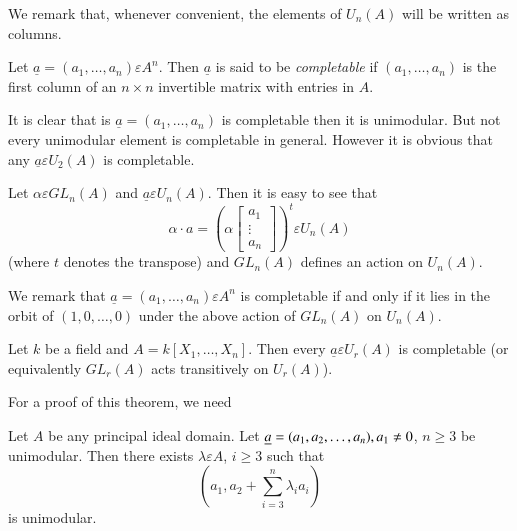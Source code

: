 We remark that, whenever convenient, the elements of $U_n(A)$ will be
written as columns.

\begin{dfn}\label{c2:dfn2.1}
Let $\underline{a}=(a_1,\ldots,a_n)\varepsilon A^{n}$. Then
$\underline{a}$ is said to be \textit{completable} if
$(a_1,\ldots,a_n)$ is the first column of an $n\times n$ invertible
matrix with entries in $A$.

It is clear that is $\underline{a}=(a_1,\ldots,a_n)$ is completable
then it is unimodular. But not every unimodular element is completable
in general. However it is obvious that any $\underline{a}\varepsilon
U_2(A)$ is completable.

Let $\alpha \varepsilon GL_n(A)$ and $\underline{a}\varepsilon
U_n(A)$. Then it is easy to see that 
$$
\alpha\cdot a=\left(\alpha\begin{bmatrix}
a_1\\
\vdots\\
a_n
\end{bmatrix}\right)^{t} \varepsilon U_n(A)
$$
(where $t$ denotes the transpose) and $GL_n(A)$ defines an action on
$U_n(A)$.

We remark that $\underline{a}=(a_1,\ldots,a_n)\varepsilon A^{n}$ is
completable if and only if it lies in the orbit of $(1,0,\ldots,0)$
under the above action of $GL_n(A)$ on $U_n(A)$.
\end{dfn}


\begin{thm}\label{c2:thm2.2}
Let $k$ be a field and $A=k[X_1,\ldots,X_n]$. Then every
$\underline{a}\varepsilon U_r(A)$ is completable (or equivalently
$GL_r(A)$ acts transitively on $U_r(A)$).
\end{thm}

For a proof of this theorem, we need

\begin{lem}\label{c2:lem2.3}
Let  $A$ be any principal ideal domain. Let
$\underline{a}=\\(a_1,a_2,\ldots,a_n), a_1\neq 0$, $n\geq 3$ be
unimodular. Then there exists $\lambda \varepsilon A$, $i\geq 3$ such
that 
$$
\left(a_1,a_2+\sum\limits_{i=3}^{n}\lambda_ia_i\right)
$$
is unimodular.
\end{lem}

